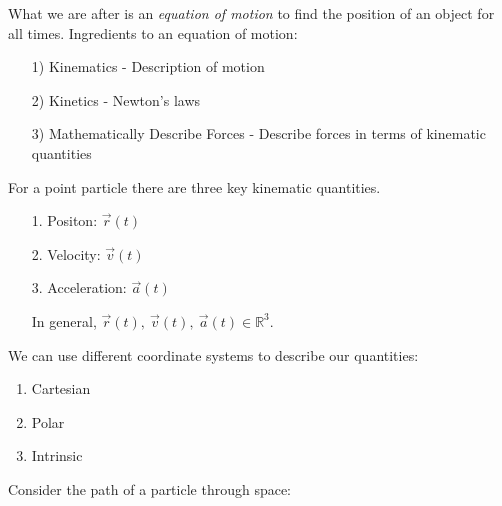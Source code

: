 \documentclass[10pt]{scrartcl}
\begin{document}
 
What we are after is an \emph{equation of motion} to find the position of an object for all times. Ingredients to an equation of motion:\begin{enumerate}
\item[1)] Kinematics - Description of motion 
\item[2)] Kinetics - Newton's laws
\item[3)] Mathematically Describe Forces - Describe forces in terms of kinematic quantities
\end{enumerate}





For a point particle there are three key kinematic quantities.\begin{enumerate}
\item[1.] Positon: $\vec{r}(t)$
\item[2.] Velocity: $\vec{v}(t)$
\item[3.] Acceleration: $\vec{a}(t)$

In general, $\vec{r}(t),~\vec{v}(t),~\vec{a}(t) \in \mathbb{R}^3$. 
\end{enumerate}\vspace*{5pt}

We can use different coordinate systems to describe our quantities:
\begin{enumerate}
\item Cartesian
\item Polar
\item Intrinsic	
\end{enumerate}


Consider the path of a particle through space:
\end{document}

